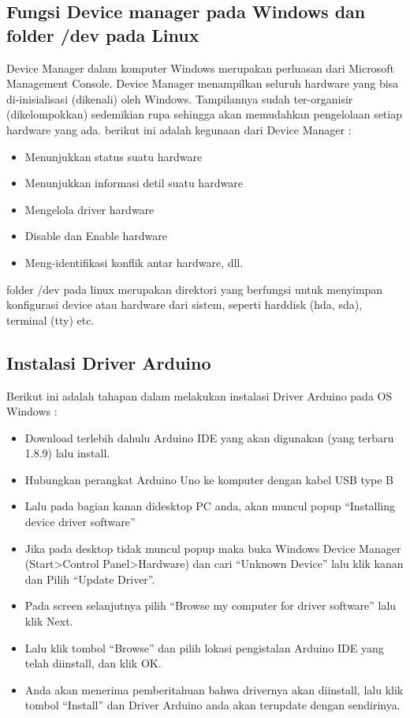 \subsection{ Fungsi Device manager pada Windows dan folder /dev pada Linux}
Device Manager dalam komputer Windows merupakan perluasan dari Microsoft Management Console. Device Manager menampilkan seluruh hardware yang bisa di-inisialisasi (dikenali) oleh Windows. Tampilannya sudah ter-organisir (dikelompokkan) sedemikian rupa sehingga akan memudahkan pengelolaan setiap hardware yang ada. berikut ini adalah kegunaan dari Device Manager :
\begin{itemize}
\item Menunjukkan status suatu hardware
\item Menunjukkan informasi detil suatu hardware
\item Mengelola driver hardware
\item Disable dan Enable hardware
\item Meng-identifikasi konflik antar hardware, dll.
\end{itemize}
folder /dev pada linux merupakan direktori yang berfungsi untuk menyimpan konfigurasi device atau hardware dari sistem, seperti harddisk (hda, sda), terminal (tty) etc.
\subsection{ Instalasi Driver Arduino}
Berikut ini adalah tahapan dalam melakukan instalasi Driver Arduino pada OS Windows :
\begin{itemize}
\item Download terlebih dahulu Arduino IDE yang akan digunakan (yang terbaru 1.8.9) lalu install.
\item Hubungkan perangkat Arduino Uno ke komputer dengan kabel USB type B 
\item Lalu pada bagian kanan didesktop PC anda, akan muncul popup “Installing device driver software”
\item Jika pada desktop tidak muncul popup maka buka Windows Device Manager (Start>Control Panel>Hardware) dan cari “Unknown Device” lalu klik kanan dan Pilih “Update Driver”.
\item Pada screen selanjutnya pilih “Browse my computer for driver software” lalu klik Next.
\item Lalu klik tombol “Browse” dan pilih lokasi pengistalan Arduino IDE yang telah diinstall, dan klik OK.
\item Anda akan menerima pemberitahuan bahwa drivernya akan diinstall, lalu klik tombol “Install” dan Driver Arduino anda akan terupdate dengan sendirinya.
\end{itemize}
